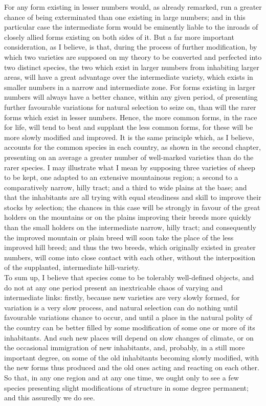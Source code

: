 \indent For any form existing in lesser numbers would, as already remarked, run a greater chance of being exterminated than one existing in large numbers; and in this particular case the intermediate form would be eminently liable to the inroads of closely allied forms existing on both sides of it. But a far more important consideration, as I believe, is that, during the process of further modification, by which two varieties are supposed on my theory to be converted and perfected into two distinct species, the two which exist in larger numbers from inhabiting larger areas, will have a great advantage over the intermediate variety, which exists in smaller numbers in a narrow and intermediate zone. For forms existing in larger numbers will always have a better chance, within any given period, of presenting further favourable variations for natural selection to seize on, than will the rarer forms which exist in lesser numbers. Hence, the more common forms, in the race for life, will tend to beat and supplant the less common forms, for these will be more slowly modified and improved. It is the same principle which, as I believe, accounts for the common species in each country, as shown in the second chapter, presenting on an average a greater number of well-marked varieties than do the rarer species. I may illustrate what I mean by supposing three varieties of sheep to be kept, one adapted to an extensive mountainous region; a second to a comparatively narrow, hilly tract; and a third to wide plains at the base; and that the inhabitants are all trying with equal steadiness and skill to improve their stocks by selection; the chances in this case will be strongly in favour of the great holders on the mountains or on the plains improving their breeds more quickly than the small holders on the intermediate narrow, hilly tract; and consequently the improved mountain or plain breed will soon take the place of the less improved hill breed; and thus the two breeds, which originally existed in greater numbers, will come into close contact with each other, without the interposition of the supplanted, intermediate hill-variety.\\
\indent To sum up, I believe that species come to be tolerably well-defined objects, and do not at any one period present an inextricable chaos of varying and intermediate links: firstly, because new varieties are very slowly formed, for variation is a very slow process, and natural selection can do nothing until favourable variations chance to occur, and until a place in the natural polity of the country can be better filled by some modification of some one or more of its inhabitants. And such new places will depend on slow changes of climate, or on the occasional immigration of new inhabitants, and, probably, in a still more important degree, on some of the old inhabitants becoming slowly modified, with the new forms thus produced and the old ones acting and reacting on each other. So that, in any one region and at any one time, we ought only to see a few species presenting slight modifications of structure in some degree permanent; and this assuredly we do see.\\
